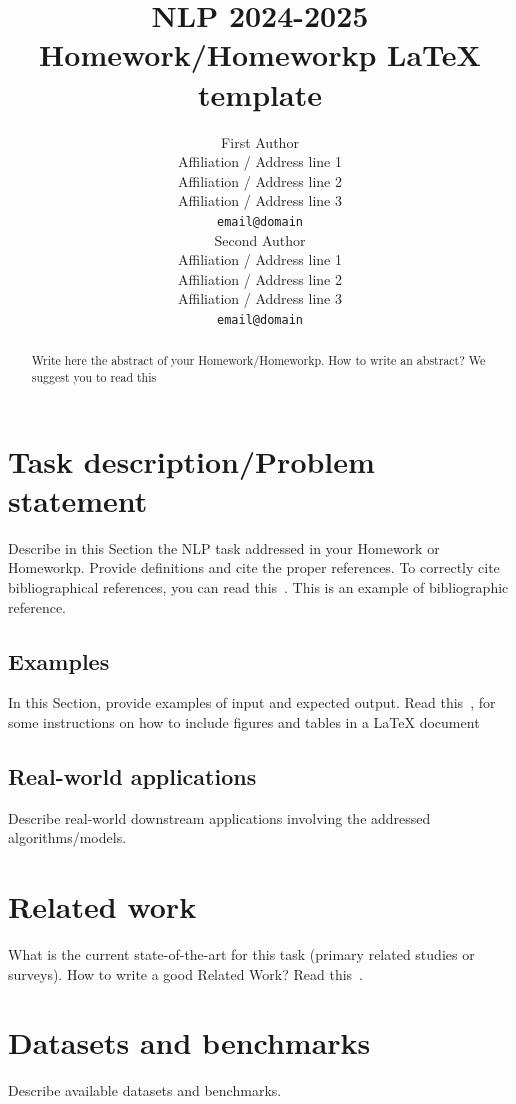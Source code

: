 \documentclass[11pt]{article}
\title{NLP 2024-2025 Homework/Homeworkp LaTeX template}
\author{First Author \\
  Affiliation / Address line 1 \\
  Affiliation / Address line 2 \\
  Affiliation / Address line 3 \\
  {\tt email@domain} \\\And
  Second Author \\
  Affiliation / Address line 1 \\
  Affiliation / Address line 2 \\
  Affiliation / Address line 3 \\
  {\tt email@domain} \\}
\date{}
\begin{document}
\maketitle
\begin{abstract}
 Write here the abstract of your Homework/Homeworkp.
 How to write an abstract? We suggest you to read this~\cite{howabstract}
\end{abstract}



\section{Task description/Problem statement}
Describe in this Section the NLP task addressed in your Homework or Homeworkp.
Provide definitions and cite the proper references.
To correctly cite bibliographical references, you can read this~\cite{latexguide}. This \cite{DevlinCLT19} is an example of bibliographic reference.

\subsection{Examples}
In this Section, provide examples of input and expected output.
Read this~\cite{latexfig}, for some instructions on how to include figures and tables in a LaTeX document


\subsection{Real-world applications}
Describe real-world downstream applications involving the addressed algorithms/models.

\section{Related work}
What is the current state-of-the-art for this task (primary related studies or surveys).
How to write a good Related Work? Read this~\cite{relatedwork}.

\section{Datasets and benchmarks}
Describe available datasets and benchmarks.
\end{document}
